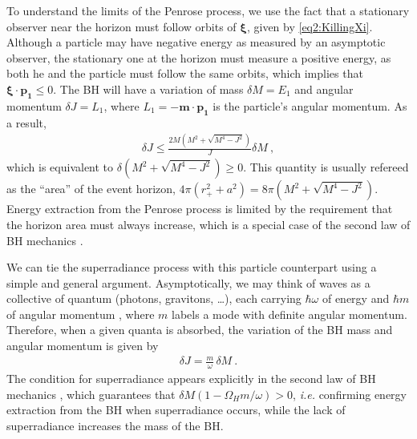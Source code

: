 To understand the limits of the Penrose process, we use the fact that a stationary observer near the horizon must follow orbits of $\bm{\xi}$, given by \eqref{eq2:KillingXi}. 
Although a particle may have negative energy as measured by an asymptotic observer, the stationary one at the horizon must measure a positive energy, as both he and the particle must follow the same orbits, which implies that $\bm{\xi} \cdot  \bm{p_1} \le 0$.
The BH will have a variation of mass $\delta M =E_1$ and angular momentum $\delta J = L_1$, where $L_1 = - \bm{m} \cdot \bm{p_1}$ is the particle's angular momentum. As a result,
\begin{align}
    \label{eq2:penroseCondition}
    \delta J \le \frac{2M\left(M^2+\sqrt{M^4-J^2}\right)}{J} \delta M ~,
\end{align}
which is equivalent to $\delta \left(M^2+\sqrt{M^4-J^2}\right) \ge 0$. This quantity is usually refereed as the ``area'' of the event horizon, $4\pi(r_+^2+a^2)=8\pi\left(M^2+\sqrt{M^4-J^2}\right)$.
Energy extraction from the Penrose process is limited by the requirement that the horizon area must always increase, which is a special case of the second law of BH mechanics \cite{Hawking1973}. 

We can tie the superradiance process with this particle counterpart using a simple and general argument.
Asymptotically, we may think of waves as a collective of quantum (photons, gravitons, \dots), each carrying $\hbar \omega$ of energy and $\hbar m$ of angular momentum \cite{Bekenstein1973}, where $m$ labels a mode with definite angular momentum.
Therefore, when a given quanta is absorbed, the variation of the BH mass and angular momentum is given by
\begin{align}
    \label{eq2:spinMassRatio}
    \delta J = \frac{m}{\omega} \,\delta M ~.
\end{align}
The condition for superradiance  appears explicitly in the second law of BH mechanics , which guarantees that $\delta M (1 - \Omega_H m /\omega)>0$, \emph{i.e.} confirming energy extraction from the BH when superradiance occurs, while the lack of superradiance increases the mass of the BH.


\cleardoublepage